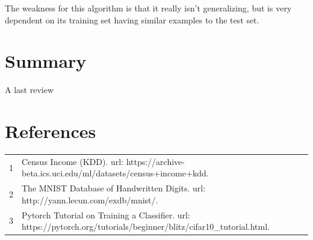 \documentclass[letterpaper]{article} %
\begin{document}
The weakness for this algorithm is that it really isn't generalizing, but is very dependent on its training set having similar examples to the test set.

\section{Summary}
A last review 

\section{References}
\begin{tabular}{l p{2.75in}}
\\
1 & Census Income (KDD). url: https://archive-beta.ics.uci.edu/ml/datasets/census+income+kdd.
\\
2 & The MNIST Database of Handwritten Digits. url: http://yann.lecun.com/exdb/mnist/.
\\
3 & Pytorch Tutorial on Training a Classifier. url: https://pytorch.org/tutorials/beginner/blitz/cifar10\_tutorial.html.
\end{tabular}
\end{document}
